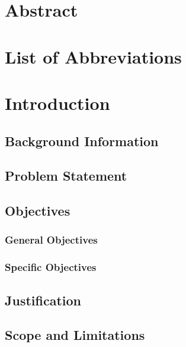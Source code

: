 \documentclass[12pt, a4paper]{article}
\begin{document}
\section*{Abstract}
\Blindtext
\clearpage

\begin{center}
    \tableofcontents
    \clearpage
\end{center}
%
\begin{center}
    \listoffigures
    \clearpage
\end{center}
%
\begin{center}
    \listoftables
    \clearpage
\end{center}
%
\begin{center}
    \listofmyequations
    \clearpage
\end{center}
%
\section*{List of Abbreviations}
\clearpage
{}
\section{Introduction}
\subsection{Background Information}
\subsection{Problem Statement}
\subsection{Objectives}
\subsubsection{General Objectives}
\subsubsection{Specific Objectives}
\subsection{Justification}
\subsection{Scope and Limitations}
\end{document}
